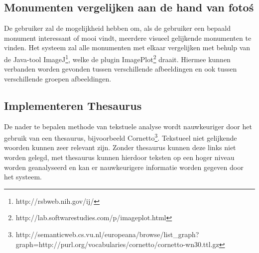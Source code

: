 \documentclass[a4paper,10pt]{article}
\begin{document}
			\subsection{Monumenten vergelijken aan de hand van foto\'s}
			De gebruiker zal de mogelijkheid hebben om, als de gebruiker een bepaald monument interessant of mooi vindt, meerdere visueel gelijkende monumenten te vinden. Het systeem zal alle monumenten met elkaar vergelijken met behulp van de Java-tool ImageJ\footnote{http://rsbweb.nih.gov/ij/}, welke de plugin ImagePlot\footnote{http://lab.softwarestudies.com/p/imageplot.html} draait. Hiermee kunnen verbanden worden gevonden tussen verschillende afbeeldingen en ook tussen verschillende groepen afbeeldingen.
				
			\subsection{Implementeren Thesaurus}
			De nader te bepalen methode van tekstuele analyse wordt nauwkeuriger door het gebruik van een thesaurus, bijvoorbeeld Cornetto\footnote{http://semanticweb.cs.vu.nl/europeana/browse/list\_graph?graph=http://purl.org/vocabularies/cornetto/cornetto-wn30.ttl.gz}. Tekstueel niet gelijkende woorden kunnen zeer relevant zijn. Zonder thesaurus kunnen deze links niet worden gelegd, met thesaurus kunnen hierdoor teksten op een hoger niveau worden geanalyseerd en kan er nauwkeurigere informatie worden gegeven door het systeem.
		
		\clearpage
\end{document}
